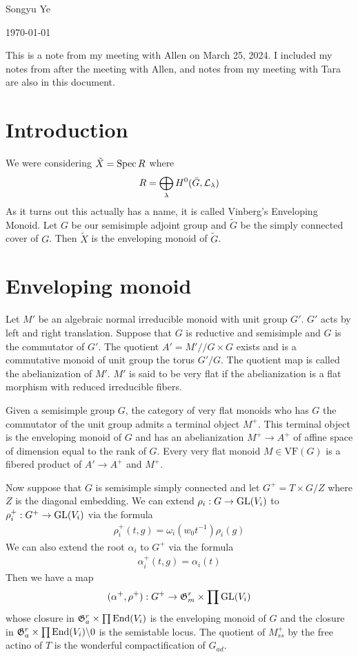 \documentclass[12pt]{article}
\begin{document}
Songyu Ye

\today

\hfill

This is a note from my meeting with Allen on March 25, 2024.
I included my notes from after the meeting with Allen, and notes from my meeting with Tara are also in this document.

\section{Introduction}
We were considering $\tilde X = \operatorname{Spec} R$ where \begin{align*}
    R = \bigoplus_\lambda H^0(\bar G, {\mathcal{L}}_\lambda)
\end{align*} As it turns out this actually has a name, it is called Vinberg's Enveloping Monoid.
Let $G$ be our semisimple adjoint group and $\tilde G$ be the simply connected cover of $G$.
Then $\tilde X$ is the enveloping monoid of $\tilde G$.

\section{Enveloping monoid}
Let $M'$ be an algebraic normal irreducible monoid with unit group $G'$. $G'$ acts by left
and right translation. Suppose that $G$ is reductive and semisimple and $G$ is the commutator of $G'$. 
The quotient $A' = M'//G\times G$ exists and is a commutative monoid of unit group the torus $G'/G$.
The quotient map is called the abelianization of $M'$. $M'$ is said to be very flat if the abelianization is
a flat morphism with reduced irreducible fibers.

\hfill

Given a semisimple group $G$, the category of very flat monoids who has $G$ the commutator of the unit group admits
a terminal object $M^+$. This terminal object is the enveloping monoid of $G$ and
has an abelianization $M^+\to A^+$ of affine space of dimension equal to the rank of $G$. 
Every very flat monoid $M\in \text{VF}(G)$ is a fibered product of $A'\to A^+$ and $M^+$.

\hfill

Now suppose that $G$ is semisimple simply connected and let $G^+ = T\times G/Z$ where $Z$
is the diagonal embedding. We can extend $\rho_i:G\to \operatorname{GL}(V_i)$ to $\rho_i^+:G^+\to \operatorname{GL}(V_i)$ via
the formula \begin{align*}
    \rho_i^+(t, g) = \omega_i(w_0t^{-1})\rho_i(g)
\end{align*}
We can also extend the root $\alpha_i$ to $G^+$ via the formula \begin{align*}
    \alpha_i^+(t, g) = \alpha_i(t)
\end{align*} Then we have a map \begin{align*}
    (\alpha^+, \rho^+):G^+\to \mathfrak{G}_m^r \times \prod \operatorname{GL}(V_i)
\end{align*}
whose closure in $\mathfrak{G}_a^r\times \prod\operatorname{End}(V_i)$ is the enveloping monoid of $G$ and the closure in 
$\mathfrak{G}_a^r\times \prod\operatorname{End}(V_i) \backslash 0$ is the semistable locus. The 
quotient of $M^+_{ss}$ by the free actino of $T$ is the wonderful compactification of $G_{ad}$.
\end{document}
